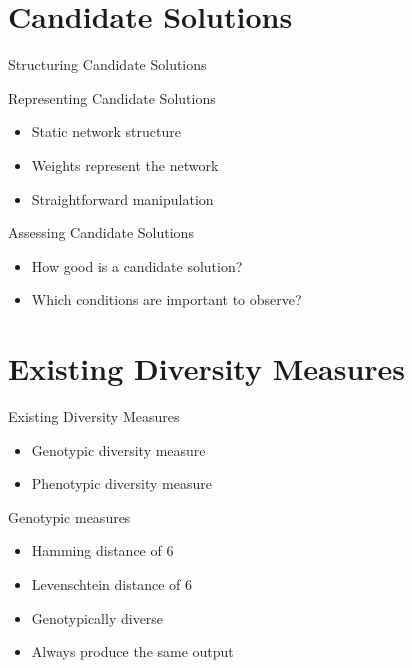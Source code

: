 \section{Candidate Solutions}

\begin{frame}{Structuring Candidate Solutions}
  \begin{center}
    
  \end{center}
\end{frame}

\begin{frame}{Representing Candidate Solutions}
  \begin{itemize}
    \item Static network structure
    \item Weights represent the network
    \item Straightforward manipulation
  \end{itemize}
\end{frame}

\begin{frame}{Assessing Candidate Solutions}
  \begin{itemize}
    \item How good is a candidate solution?
    \item Which conditions are important to observe?
  \end{itemize}
\end{frame}

\section{Existing Diversity Measures}

\begin{frame}{Existing Diversity Measures}
  \begin{itemize}
    \item Genotypic diversity measure
    \item Phenotypic diversity measure
  \end{itemize}
\end{frame}

\begin{frame}{Genotypic measures}
  

  \begin{itemize}
    \item Hamming distance of 6
    \item Levenschtein distance of 6
    \item Genotypically diverse
    \item Always produce the same output
  \end{itemize}
\end{frame}


